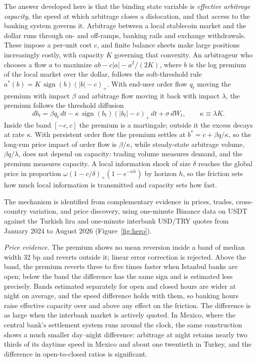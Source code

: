 \documentclass[12pt]{article}
\theoremstyle{definition}
\theoremstyle{remark}
\newcommand{\sgn}{\operatorname{sign}}
\newcommand{\pos}[1]{\left(#1\right)_+}
\begin{document}
The answer developed here is that the binding state variable is \emph{effective arbitrage capacity}, the speed at which arbitrage closes a dislocation, and that access to the banking system governs it. Arbitrage between a local stablecoin market and the dollar runs through on- and off-ramps, banking rails and exchange withdrawals. These impose a per-unit cost $c$, and finite balance sheets make large positions increasingly costly, with capacity $K$ governing that convexity. An arbitrageur who chooses a flow $a$ to maximize $ab - c|a| - a^2/(2K)$, where $b$ is the log premium of the local market over the dollar, follows the soft-threshold rule $a^*(b) = K\,\sgn(b)\pos{|b|-c}$. With end-user order flow $q_t$ moving the premium with impact $\beta$ and arbitrage flow moving it back with impact $\lambda$, the premium follows the threshold diffusion
\[
db_t = \beta q_t\,dt - \kappa\,\sgn(b_t)\pos{|b_t|-c}\,dt + \sigma\,dW_t ,\qquad \kappa\equiv\lambda K .
\]
Inside the band $[-c,c]$ the premium is a martingale; outside it the excess decays at rate $\kappa$. With persistent order flow the premium settles at $b^* = c + \beta q/\kappa$, so the long-run price impact of order flow is $\beta/\kappa$, while steady-state arbitrage volume, $\beta q/\lambda$, does not depend on capacity: trading volume measures demand, and the premium measures capacity. A local information shock of size $\delta$ reaches the global price in proportion $\omega(1-c/\delta)_+(1-e^{-\kappa h})$ by horizon $h$, so the friction sets how much local information is transmitted and capacity sets how fast.

The mechanism is identified from complementary evidence in prices, trades, cross-country variation, and price discovery, using one-minute Binance data on USDT against the Turkish lira and one-minute interbank USD/TRY quotes from January 2024 to August 2026 (Figure~\ref{fig:hero}).

\emph{Price evidence.} The premium shows no mean reversion inside a band of median width 32 bp and reverts outside it; linear error correction is rejected. Above the band, the premium reverts three to five times faster when Istanbul banks are open; below the band the difference has the same sign and is estimated less precisely. Bands estimated separately for open and closed hours are wider at night on average, and the speed difference holds with them, so banking hours raise effective capacity over and above any effect on the friction. The difference is as large when the interbank market is actively quoted. In Mexico, where the central bank's settlement system runs around the clock, the same construction shows a much smaller day--night difference: arbitrage at night retains nearly two thirds of its daytime speed in Mexico and about one twentieth in Turkey, and the difference in open-to-closed ratios is significant.
\end{document}
